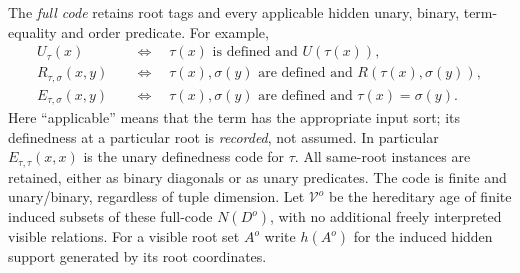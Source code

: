The \emph{full code} retains root tags and every applicable hidden unary,
binary, term-equality and order predicate. For example,
\[
\begin{aligned}
 U_\tau(x)&\quad\Longleftrightarrow\quad
                 \tau(x)\text{ is defined and }U(\tau(x)),\\
 R_{\tau,\sigma}(x,y)&\quad\Longleftrightarrow\quad
       \tau(x),\sigma(y)\text{ are defined and }R(\tau(x),\sigma(y)),\\
 E_{\tau,\sigma}(x,y)&\quad\Longleftrightarrow\quad
       \tau(x),\sigma(y)\text{ are defined and }\tau(x)=\sigma(y).
\end{aligned}
\]
Here ``applicable'' means that the term has the appropriate input sort;
its definedness at a particular root is \emph{recorded}, not assumed.
In particular $E_{\tau,\tau}(x,x)$ is the unary definedness code for
$\tau$. All same-root instances are retained, either as binary diagonals
or as unary predicates. The code is finite and unary/binary, regardless
of tuple dimension. Let $\mathcal V^o$ be the hereditary age of finite
induced subsets of these full-code $N(D^o)$, with no additional freely
interpreted visible relations. For a visible root set $A^o$ write $h(A^o)$
for the induced hidden support generated by its root coordinates.

